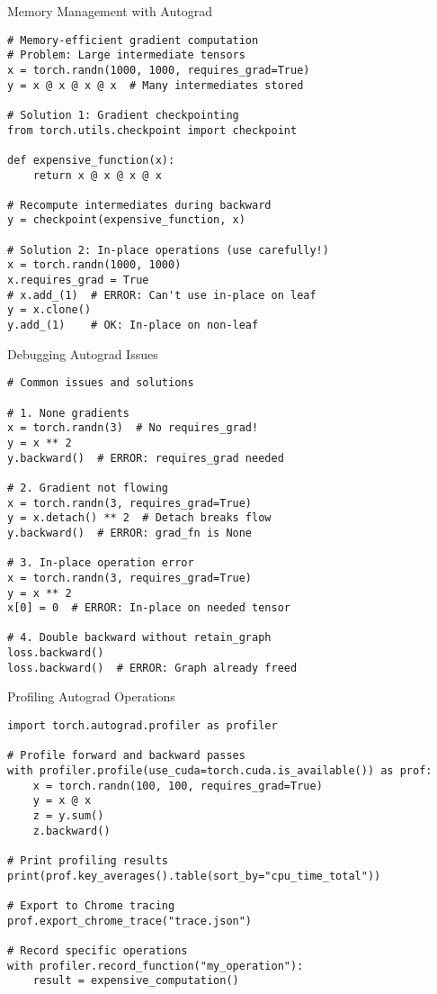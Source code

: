 \documentclass[aspectratio=169,10pt]{beamer}
\begin{document}
\begin{frame}[fragile]{Memory Management with Autograd}
\begin{lstlisting}
# Memory-efficient gradient computation
# Problem: Large intermediate tensors
x = torch.randn(1000, 1000, requires_grad=True)
y = x @ x @ x @ x  # Many intermediates stored

# Solution 1: Gradient checkpointing
from torch.utils.checkpoint import checkpoint

def expensive_function(x):
    return x @ x @ x @ x

# Recompute intermediates during backward
y = checkpoint(expensive_function, x)

# Solution 2: In-place operations (use carefully!)
x = torch.randn(1000, 1000)
x.requires_grad = True
# x.add_(1)  # ERROR: Can't use in-place on leaf
y = x.clone()
y.add_(1)    # OK: In-place on non-leaf
\end{lstlisting}
\end{frame}

\begin{frame}[fragile]{Debugging Autograd Issues}
\begin{lstlisting}
# Common issues and solutions

# 1. None gradients
x = torch.randn(3)  # No requires_grad!
y = x ** 2
y.backward()  # ERROR: requires_grad needed

# 2. Gradient not flowing
x = torch.randn(3, requires_grad=True)
y = x.detach() ** 2  # Detach breaks flow
y.backward()  # ERROR: grad_fn is None

# 3. In-place operation error
x = torch.randn(3, requires_grad=True)
y = x ** 2
x[0] = 0  # ERROR: In-place on needed tensor

# 4. Double backward without retain_graph
loss.backward()
loss.backward()  # ERROR: Graph already freed
\end{lstlisting}
\end{frame}

\begin{frame}[fragile]{Profiling Autograd Operations}
\begin{lstlisting}
import torch.autograd.profiler as profiler

# Profile forward and backward passes
with profiler.profile(use_cuda=torch.cuda.is_available()) as prof:
    x = torch.randn(100, 100, requires_grad=True)
    y = x @ x
    z = y.sum()
    z.backward()

# Print profiling results
print(prof.key_averages().table(sort_by="cpu_time_total"))

# Export to Chrome tracing
prof.export_chrome_trace("trace.json")

# Record specific operations
with profiler.record_function("my_operation"):
    result = expensive_computation()
\end{lstlisting}
\end{frame}
\end{document}
